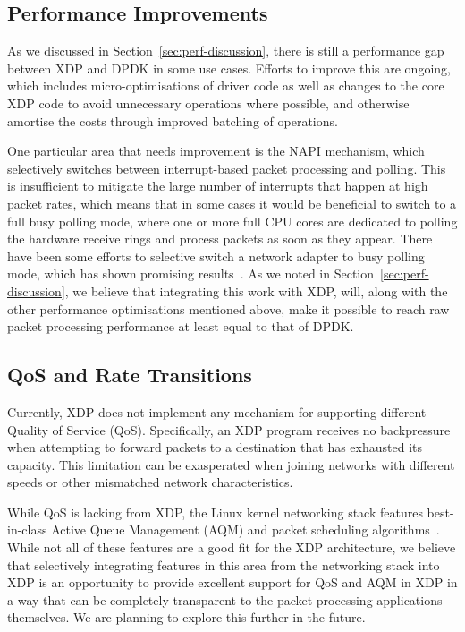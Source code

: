 \documentclass[10pt,sigconf,anonymous]{acmart}
\begin{document}
\subsection{Performance Improvements}
\label{sec:improvements-napi}
As we discussed in Section~\ref{sec:perf-discussion}, there is still a
performance gap between XDP and DPDK in some use cases. Efforts to improve this
are ongoing, which includes micro-optimisations of driver code as well as
changes to the core XDP code to avoid unnecessary operations where possible, and
otherwise amortise the costs through improved batching of operations.

One particular area that needs improvement is the NAPI mechanism, which
selectively switches between interrupt-based packet processing and polling. This
is insufficient to mitigate the large number of interrupts that happen at high
packet rates, which means that in some cases it would be beneficial to switch to
a full busy polling mode, where one or more full CPU cores are dedicated to
polling the hardware receive rings and process packets as soon as they appear.
There have been some efforts to selective switch a network adapter to busy
polling mode, which has shown promising results~\cite{dumazet17:_busyp}. As we
noted in Section~\ref{sec:perf-discussion}, we believe that integrating this
work with XDP, will, along with the other performance optimisations mentioned
above, make it possible to reach raw packet processing performance at least
equal to that of DPDK.

\subsection{QoS and Rate Transitions}
\label{sec:handl-rate-trans}
Currently, XDP does not implement any mechanism for supporting different Quality
of Service (QoS). Specifically, an XDP program receives no backpressure when
attempting to forward packets to a destination that has exhausted its capacity.
This limitation can be exasperated when joining networks with different speeds
or other mismatched network characteristics.

While QoS is lacking from XDP, the Linux kernel networking stack features
best-in-class Active Queue Management (AQM) and packet scheduling
algorithms~\cite{good-bad-wifi}. While not all of these features are a good fit
for the XDP architecture, we believe that selectively integrating features in
this area from the networking stack into XDP is an opportunity to provide
excellent support for QoS and AQM in XDP in a way that can be completely
transparent to the packet processing applications themselves. We are planning to
explore this further in the future.
\end{document}
